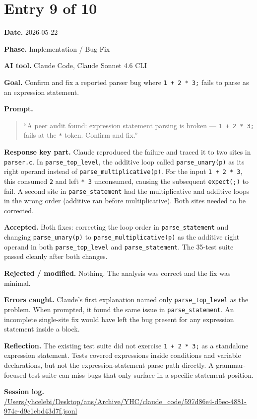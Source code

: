 \documentclass[11pt,a4paper]{article}
\newcommand{\field}[2]{\textbf{#1.} #2\par}
\newcommand{\prompt}[1]{%
  \textbf{Prompt.}
  \begin{quote}\small #1\end{quote}
}
\newcommand{\sessionlog}[1]{\textbf{Session log.} \url{#1}\par}
\begin{document}
\section{Entry 9 of 10}
\field{Date}{2026-05-22}
\field{Phase}{Implementation / Bug Fix}
\field{AI tool}{Claude Code, Claude Sonnet 4.6 CLI}
\field{Goal}{Confirm and fix a reported parser bug where \texttt{1 + 2 * 3;} fails to parse as an expression statement.}
\prompt{``A peer audit found: expression statement parsing is broken --- \texttt{1 + 2 * 3;} fails at the \texttt{*} token. Confirm and fix.''}
\field{Response key part}{Claude reproduced the failure and traced it to two sites in \texttt{parser.c}. In \texttt{parse\_top\_level}, the additive loop called \texttt{parse\_unary(p)} as its right operand instead of \texttt{parse\_multiplicative(p)}. For the input \texttt{1 + 2 * 3}, this consumed \texttt{2} and left \texttt{* 3} unconsumed, causing the subsequent \texttt{expect(;)} to fail. A second site in \texttt{parse\_statement} had the multiplicative and additive loops in the wrong order (additive ran before multiplicative). Both sites needed to be corrected.}
\field{Accepted}{Both fixes: correcting the loop order in \texttt{parse\_statement} and changing \texttt{parse\_unary(p)} to \texttt{parse\_multiplicative(p)} as the additive right operand in both \texttt{parse\_top\_level} and \texttt{parse\_statement}. The 35-test suite passed cleanly after both changes.}
\field{Rejected / modified}{Nothing. The analysis was correct and the fix was minimal.}
\field{Errors caught}{Claude's first explanation named only \texttt{parse\_top\_level} as the problem. When prompted, it found the same issue in \texttt{parse\_statement}. An incomplete single-site fix would have left the bug present for any expression statement inside a block.}
\field{Reflection}{The existing test suite did not exercise \texttt{1 + 2 * 3;} as a standalone expression statement. Tests covered expressions inside conditions and variable declarations, but not the expression-statement parse path directly. A grammar-focused test suite can miss bugs that only surface in a specific statement position.}
\sessionlog{/Users/yhcelebi/Desktop/ans/Archive/YHC/claude_code/597d86e4-d5ec-4881-974c-d9c1ebd43d7f.jsonl}

\end{document}
